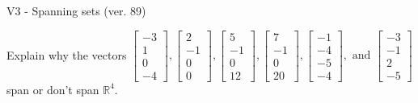 \begin{exercise}
  \begin{exerciseTitle}V3 - Spanning sets (ver. 89)\end{exerciseTitle}
  \begin{exerciseStatement}
    Explain why the vectors \(\left[\begin{array}{r}
-3 \\
1 \\
0 \\
-4
\end{array}\right] , \left[\begin{array}{r}
2 \\
-1 \\
0 \\
0
\end{array}\right] , \left[\begin{array}{r}
5 \\
-1 \\
0 \\
12
\end{array}\right] , \left[\begin{array}{r}
7 \\
-1 \\
0 \\
20
\end{array}\right] , \left[\begin{array}{r}
-1 \\
-4 \\
-5 \\
-4
\end{array}\right] , \text{ and } \left[\begin{array}{r}
-3 \\
-1 \\
2 \\
-5
\end{array}\right]\) span or don't span \(\mathbb{R}^4\). 
	



\end{exerciseStatement}
\end{exercise}
